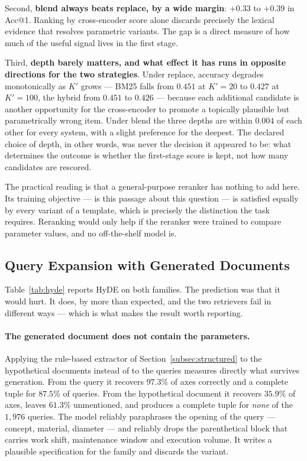 \documentclass[preprint,12pt]{elsarticle}
\begin{document}
Second, \textbf{blend always beats replace, by a wide margin}: $+0.33$ to $+0.39$ in Acc@1. Ranking by cross-encoder score alone discards precisely the lexical evidence that resolves parametric variants. The gap is a direct measure of how much of the useful signal lives in the first stage.

Third, \textbf{depth barely matters, and what effect it has runs in opposite directions for the two strategies}. Under replace, accuracy degrades monotonically as $K'$ grows --- BM25 falls from $0.451$ at $K'=20$ to $0.427$ at $K'=100$, the hybrid from $0.451$ to $0.426$ --- because each additional candidate is another opportunity for the cross-encoder to promote a topically plausible but parametrically wrong item. Under blend the three depths are within $0.004$ of each other for every system, with a slight preference for the deepest. The declared choice of depth, in other words, was never the decision it appeared to be: what determines the outcome is whether the first-stage score is kept, not how many candidates are rescored.

The practical reading is that a general-purpose reranker has nothing to add here. Its training objective --- is this passage about this question --- is satisfied equally by every variant of a template, which is precisely the distinction the task requires. Reranking would only help if the reranker were trained to compare parameter values, and no off-the-shelf model is.

\subsection{Query Expansion with Generated Documents}
\label{subsec:hyde_results}

Table~\ref{tab:hyde} reports HyDE on both families. The prediction was that it would hurt. It does, by more than expected, and the two retrievers fail in different ways --- which is what makes the result worth reporting.



\paragraph{The generated document does not contain the parameters.}
Applying the rule-based extractor of Section~\ref{subsec:structured} to the hypothetical documents instead of to the queries measures directly what survives generation. From the query it recovers $97.3\%$ of axes correctly and a complete tuple for $87.5\%$ of queries. From the hypothetical document it recovers $35.9\%$ of axes, leaves $61.3\%$ unmentioned, and produces a complete tuple for \emph{none} of the $1{,}976$ queries. The model reliably paraphrases the opening of the query --- concept, material, diameter --- and reliably drops the parenthetical block that carries work shift, maintenance window and execution volume. It writes a plausible specification for the family and discards the variant.
\end{document}

